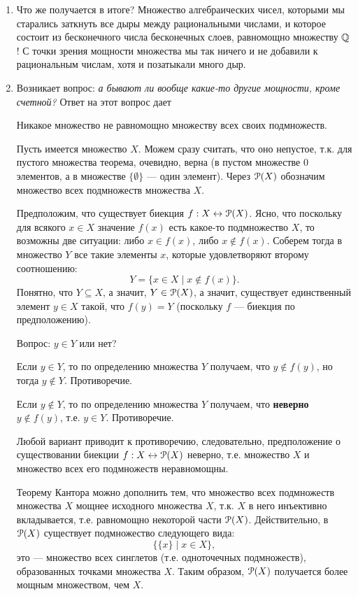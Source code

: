 \begin{enumerate}
\item Что же получается в итоге? Множество алгебраических чисел, которыми мы старались заткнуть все дыры между рациональными числами, и которое состоит из бесконечного числа бесконечных слоев, равномощно множеству $\mathbb Q$! С точки зрения мощности множества мы так ничего и не добавили к рациональным числам, хотя и позатыкали много дыр.
\item Возникает вопрос: \textit{а бывают ли вообще какие-то другие мощности, кроме счетной?} Ответ на этот вопрос дает
\begin{thrm}[Кантора]
Никакое множество не равномощно множеству всех своих подмножеств.
\end{thrm}
\pf
Пусть имеется множество $X$. Можем сразу считать, что оно непустое, т.к. для пустого множества теорема, очевидно, верна (в пустом множестве 0 элементов, а в множестве $\{\emptyset\}$ --- один элемент). Через $\mathcal P(X)$ обозначим множество всех подмножеств множества $X$.

Предположим, что существует биекция $f:X\leftrightarrow\mathcal P(X)$. Ясно, что поскольку для всякого $x\in X$ значение $f(x)$ есть какое-то подмножество $X$, то возможны две ситуации: либо $x\in f(x)$, либо $x\notin f(x)$. Соберем тогда в множество $Y$ все такие элементы $x$, которые удовлетворяют второму соотношению:
$$
Y=\{x\in X\mid x\notin f(x)\}.
$$
Понятно, что $Y\subseteq X$, а значит, $Y\in\mathcal P(X)$, а значит, существует единственный элемент $y\in X$ такой, что $f(y)=Y$ (поскольку $f$ --- биекция по предположению).

Вопрос: $y\in Y$ или нет?

Если $y\in Y$, то по определению множества $Y$ получаем, что $y\notin f(y)$, но тогда $y\notin Y$. Противоречие.

Если $y\notin Y$, то по определению множества $Y$ получаем, что \textbf{неверно} $y\notin f(y)$, т.е. $y\in Y$. Противоречие.

Любой вариант приводит к противоречию, следовательно, предположение о существовании биекции $f:X\leftrightarrow\mathcal P(X)$ неверно, т.е. множество $X$ и множество всех его подмножеств неравномощны.
\epf

Теорему Кантора можно дополнить тем, что множество всех подмножеств множества $X$ мощнее исходного множества $X$, т.к. $X$ в него инъективно вкладывается, т.е. равномощно некоторой части $\mathcal P(X)$. Действительно, в $\mathcal P(X)$ существует подмножество следующего вида:
$$
\{\{x\}\mid x\in X\},
$$
это --- множество всех синглетов (т.е. одноточечных подмножеств), образованных точками множества $X$. Таким образом, $\mathcal P(X)$ получается более мощным множеством, чем $X$.


\end{enumerate}
